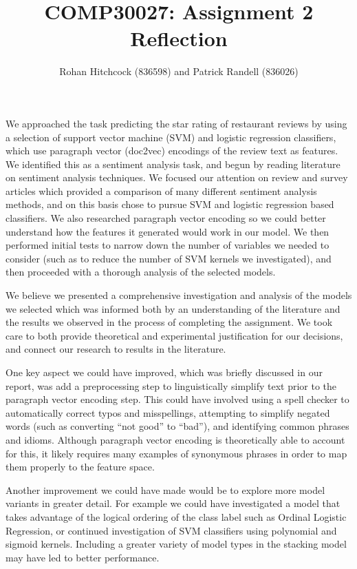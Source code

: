 \documentclass[11pt]{article}
\begin{document}
\title{\textbf{COMP30027: Assignment 2 Reflection}}
\author{Rohan Hitchcock (836598) and Patrick Randell (836026)}
\date{}
\maketitle

We approached the task predicting the star rating of restaurant reviews by using a selection of support vector machine (SVM) and logistic regression classifiers, which use paragraph vector (doc2vec) encodings of the review text as features. We identified this as a sentiment analysis task, and begun by reading literature on sentiment analysis techniques. We focused our attention on review and survey articles which provided a comparison of many different sentiment analysis methods, and on this basis chose to pursue SVM and logistic regression based classifiers. We also researched paragraph vector encoding so we could better understand how the features it generated would work in our model. We then performed initial tests to narrow down the number of variables we needed to consider (such as to reduce the number of SVM kernels we investigated), and then proceeded with a thorough analysis of the selected models.

We believe we presented a comprehensive investigation and analysis of the models we selected which was informed both by an understanding of the literature and the results we observed in the process of completing the assignment. We took care to both provide theoretical and experimental justification for our decisions, and connect our research to results in the literature.

One key aspect we could have improved, which was briefly discussed in our report, was add a preprocessing step to linguistically simplify text prior to the paragraph vector encoding step. This could have involved using a spell checker to automatically correct typos and misspellings, attempting to simplify negated words (such as converting ``not good'' to ``bad''), and identifying common phrases and idioms. Although paragraph vector encoding is theoretically able to account for this, it likely requires many examples of synonymous phrases in order to map them properly to the feature space.

Another improvement we could have made would be to explore more model variants in greater detail. For example we could have investigated a model that takes advantage of the logical ordering of the class label such as Ordinal Logistic Regression, or continued investigation of SVM classifiers using polynomial and sigmoid kernels. Including a greater variety of model types in the stacking model may have led to better performance.
\end{document}
